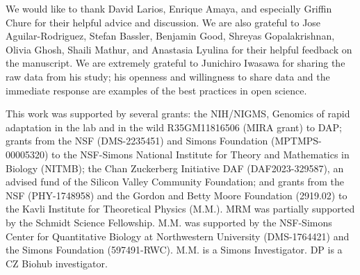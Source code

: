 \documentclass[
]{scrartcl}
\begin{document}
\begin{refsegment}
We would like to thank David Larios, Enrique Amaya, and especially
Griffin Chure for their helpful advice and discussion. We are also
grateful to Jose Aguilar-Rodriguez, Stefan Bassler, Benjamin Good,
Shreyas Gopalakrishnan, Olivia Ghosh, Shaili Mathur, and Anastasia
Lyulina for their helpful feedback on the manuscript. We are extremely
grateful to Junichiro Iwasawa for sharing the raw data from his study;
his openness and willingness to share data and the immediate response
are examples of the best practices in open science.

This work was supported by several grants: the NIH/NIGMS, Genomics of
rapid adaptation in the lab and in the wild R35GM11816506 (MIRA grant)
to DAP; grants from the NSF (DMS-2235451) and Simons Foundation
(MPTMPS-00005320) to the NSF-Simons National Institute for Theory and
Mathematics in Biology (NITMB); the Chan Zuckerberg Initiative DAF
(DAF2023-329587), an advised fund of the Silicon Valley Community
Foundation; and grants from the NSF (PHY-1748958) and the Gordon and
Betty Moore Foundation (2919.02) to the Kavli Institute for Theoretical
Physics (M.M.). MRM was partially supported by the Schmidt Science
Fellowship. M.M. was supported by the NSF-Simons Center for Quantitative
Biology at Northwestern University (DMS-1764421) and the Simons
Foundation (597491-RWC). M.M. is a Simons Investigator. DP is a CZ
Biohub investigator.

\printbibliography[segment=\therefsegment]
\end{refsegment}

\clearpage


\end{document}
